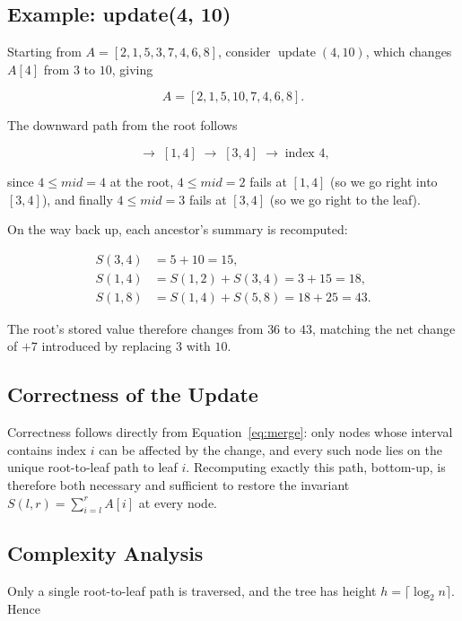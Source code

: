 \documentclass[11pt]{scrartcl}
\begin{document}
\subsection{Example: update(4, 10)}
Starting from $A = [2,1,5,3,7,4,6,8]$, consider $\operatorname{update}(4,10)$, which changes $A[4]$ from $3$ to $10$, giving

\begin{equation}
A = [2,1,5,10,7,4,6,8].
\end{equation}

The downward path from the root follows

\begin{equation}
[1,8] \;\rightarrow\; [1,4] \;\rightarrow\; [3,4] \;\rightarrow\; \text{index } 4,
\end{equation}

since $4 \le mid = 4$ at the root, $4 \le mid = 2$ fails at $[1,4]$ (so we go right into $[3,4]$), and finally $4 \le mid = 3$ fails at $[3,4]$ (so we go right to the leaf).

On the way back up, each ancestor's summary is recomputed:

\begin{align}
S(3,4) &= 5 + 10 = 15, \\
S(1,4) &= S(1,2) + S(3,4) = 3 + 15 = 18, \\
S(1,8) &= S(1,4) + S(5,8) = 18 + 25 = 43.
\end{align}

The root's stored value therefore changes from $36$ to $43$, matching the net change of $+7$ introduced by replacing $3$ with $10$.

\subsection{Correctness of the Update}
Correctness follows directly from Equation~\eqref{eq:merge}: only nodes whose interval contains index $i$ can be affected by the change, and every such node lies on the unique root-to-leaf path to leaf $i$. Recomputing exactly this path, bottom-up, is therefore both necessary and sufficient to restore the invariant $S(l,r) = \sum_{i=l}^r A[i]$ at every node.

\subsection{Complexity Analysis}
Only a single root-to-leaf path is traversed, and the tree has height $h = \lceil \log_2 n \rceil$. Hence
\end{document}
